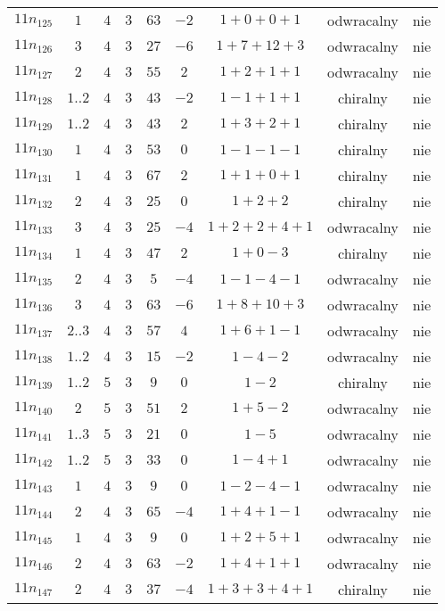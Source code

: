 \begin{longtable}{ccccccccc}
$11n_{125}$ & $1$ & $4$ & $3$ & $63$ & $-2$ & $1+0+0+1$ & odwracalny & nie \\
$11n_{126}$ & $3$ & $4$ & $3$ & $27$ & $-6$ & $1+7+12+3$ & odwracalny & nie \\
$11n_{127}$ & $2$ & $4$ & $3$ & $55$ & $2$ & $1+2+1+1$ & odwracalny & nie \\
$11n_{128}$ & $1..2$ & $4$ & $3$ & $43$ & $-2$ & $1-1+1+1$ & chiralny & nie \\
$11n_{129}$ & $1..2$ & $4$ & $3$ & $43$ & $2$ & $1+3+2+1$ & chiralny & nie \\
$11n_{130}$ & $1$ & $4$ & $3$ & $53$ & $0$ & $1-1-1-1$ & chiralny & nie \\
$11n_{131}$ & $1$ & $4$ & $3$ & $67$ & $2$ & $1+1+0+1$ & chiralny & nie \\
$11n_{132}$ & $2$ & $4$ & $3$ & $25$ & $0$ & $1+2+2$ & chiralny & nie \\
$11n_{133}$ & $3$ & $4$ & $3$ & $25$ & $-4$ & $1+2+2+4+1$ & odwracalny & nie \\
$11n_{134}$ & $1$ & $4$ & $3$ & $47$ & $2$ & $1+0-3$ & chiralny & nie \\
$11n_{135}$ & $2$ & $4$ & $3$ & $5$ & $-4$ & $1-1-4-1$ & odwracalny & nie \\
$11n_{136}$ & $3$ & $4$ & $3$ & $63$ & $-6$ & $1+8+10+3$ & odwracalny & nie \\
$11n_{137}$ & $2..3$ & $4$ & $3$ & $57$ & $4$ & $1+6+1-1$ & odwracalny & nie \\
$11n_{138}$ & $1..2$ & $4$ & $3$ & $15$ & $-2$ & $1-4-2$ & odwracalny & nie \\
$11n_{139}$ & $1..2$ & $5$ & $3$ & $9$ & $0$ & $1-2$ & chiralny & nie \\
$11n_{140}$ & $2$ & $5$ & $3$ & $51$ & $2$ & $1+5-2$ & odwracalny & nie \\
$11n_{141}$ & $1..3$ & $5$ & $3$ & $21$ & $0$ & $1-5$ & odwracalny & nie \\
$11n_{142}$ & $1..2$ & $5$ & $3$ & $33$ & $0$ & $1-4+1$ & odwracalny & nie \\
$11n_{143}$ & $1$ & $4$ & $3$ & $9$ & $0$ & $1-2-4-1$ & odwracalny & nie \\
$11n_{144}$ & $2$ & $4$ & $3$ & $65$ & $-4$ & $1+4+1-1$ & odwracalny & nie \\
$11n_{145}$ & $1$ & $4$ & $3$ & $9$ & $0$ & $1+2+5+1$ & odwracalny & nie \\
$11n_{146}$ & $2$ & $4$ & $3$ & $63$ & $-2$ & $1+4+1+1$ & odwracalny & nie \\
$11n_{147}$ & $2$ & $4$ & $3$ & $37$ & $-4$ & $1+3+3+4+1$ & chiralny & nie \\

\end{longtable}
